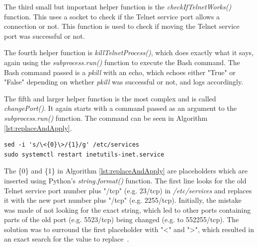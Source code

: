 The third small but important helper function is the \textit{checkIfTelnetWorks()} function. This uses a socket to check if the Telnet service port allows a connection or not. This function is used to check if moving the Telnet service port was successful or not.

The fourth helper function is \textit{killTelnetProcess()}, which does exactly what it says, again using the \textit{subprocess.run()} function to execute the Bash command. The Bash command passed is a \textit{pkill} with an echo, which echoes either "True" or "False" depending on whether \textit{pkill} was successful or not, and logs accordingly.  


 The fifth and larger helper function is the most complex and is called \textit{changePort()}. It again starts with a command passed as an argument to the \textit{subprocess.run()} function. The command can be seen in Algorithm \ref{lst:replaceAndApply}.
 \\
 
 \begin{lstlisting}[caption={The Bash Commands to Replace the old Telnet Service Port With the new one and Apply the Change.},label={lst:replaceAndApply}]
sed -i 's/\<{0}\>/{1}/g' /etc/services
sudo systemctl restart inetutils-inet.service

\end{lstlisting}


The \{0\} and \{1\} in Algorithm \ref{lst:replaceAndApply} are placeholders which are inserted using Python's \textit{string.format()} function. The first line looks for the old Telnet service port number plus "/tcp" (e.g. 23/tcp) in \textit{/etc/services} and replaces it with the new port number plus "/tcp" (e.g. 2255/tcp). Initially, the mistake was made of not looking for the exact string, which led to other ports containing parts of the old port (e.g. 5523/tcp) being changed (e.g. to 552255/tcp). The solution was to surround the first placeholder with "<" and ">", which resulted in an exact search for the value to replace~\cite{website:sed}.

